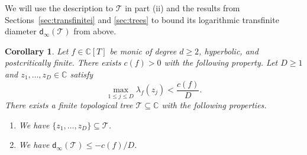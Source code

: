 \documentclass[12pt,oneside,a4]{amsart}
\newcommand{\IC}{\mathbb{C}}
\newcommand{\cT}{\mathcal{T}}
\newcounter{maincounter}
\numberwithin{maincounter}{section}
\numberwithin{equation}{section}
\newtheorem{corollary}[maincounter]{Corollary}
\renewcommand{\subset}{\subseteq}
\begin{document}
We will use the description to $\cT$ in part (ii) and the results from
Sections~\ref{sec:transfinitei} and \ref{sec:trees}  to bound its
logarithmic transfinite diameter  $\mathsf{d}_\infty(\cT)$ from above.

\begin{corollary}
  \label{cor:growtree}
  Let $f\in \IC[T]$ be monic of degree $d\ge 2$, hyperbolic, and
  postcritically finite.
  There exists $c(f)>0$ with the following property.
  Let $D\ge 1$ and $z_1,\ldots,z_D\in\IC$ satisfy
  \begin{equation}
    \label{eq:growtreeshyp}
    \max_{1\le j\le D} \lambda_f(z_j) <\frac{c(f)}{D}. 
  \end{equation}
  There exists a finite topological tree $\cT\subset\IC$ with the
  following properties.
  \begin{enumerate}
  \item [(i)] We have $\{z_1,\ldots,z_D\}\subset \cT$.

  \item[(ii)] We have $\mathsf{d}_\infty(\cT)\le -c(f)/D$.
  \end{enumerate}
\end{corollary}
\end{document}
